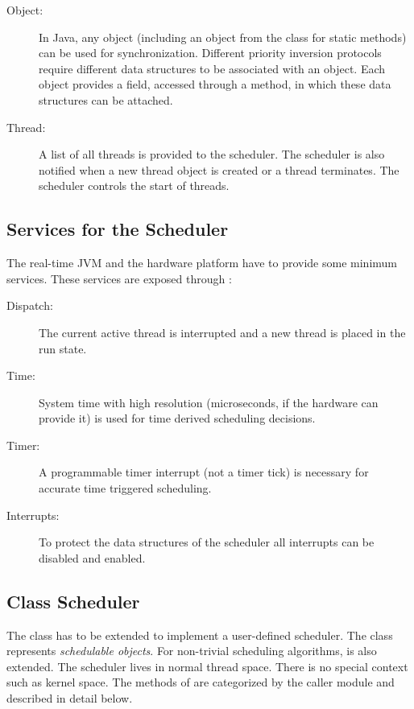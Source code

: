 \begin{description}

\item[Object:] In Java, any object (including an object from the class
 for static methods) can be used for synchronization.
Different priority inversion protocols require different data
structures to be associated with an object. Each object provides a
field, accessed through a  method, in which these
data structures can be attached.

\item[Thread:] A list of all threads is provided to the scheduler. The
scheduler is also notified when a new thread object is created or a
thread terminates. The scheduler controls the start of threads.

\end{description}

\subsection{Services for the Scheduler}

The real-time JVM and the hardware platform have to provide some
minimum services. These services are exposed through
:

\begin{description}

\item[Dispatch:] The current active thread is interrupted and a new
thread is placed in the run state.

\item[Time:] System time with high resolution (microseconds, if the
hardware can provide it) is used for time derived scheduling
decisions.

\item[Timer:] A programmable timer interrupt (not a timer tick) is
necessary for accurate time triggered scheduling.

\item[Interrupts:] To protect the data structures of the scheduler all
interrupts can be disabled and enabled.

\end{description}

\subsection{Class Scheduler}

The class  has to be extended to implement a
user-defined scheduler. The class  represents
\emph{schedulable objects}. For non-trivial scheduling algorithms,
 is also extended. The scheduler lives in normal thread
space. There is no special context such as kernel space. The methods
of  are categorized by the caller module and
described in detail below.

